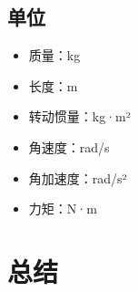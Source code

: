 \documentclass[12pt,a4paper]{article}
\begin{document}
\subsection{单位}

\begin{itemize}
\item 质量：kg
\item 长度：m
\item 转动惯量：kg·m²
\item 角速度：rad/s
\item 角加速度：rad/s²
\item 力矩：N·m
\end{itemize}

\section{总结}
\end{document}

